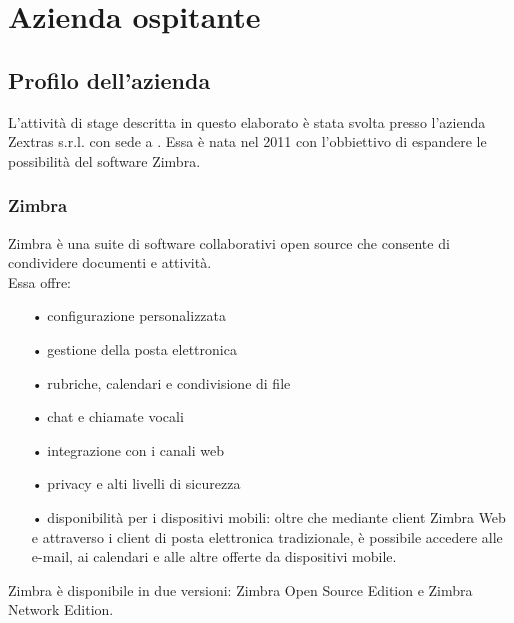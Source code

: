 \chapter{Azienda ospitante}\label{chap:company}

\section{Profilo dell'azienda}
L'attività di stage descritta in questo elaborato è stata svolta presso l'azienda Zextras s.r.l. con sede a  . Essa è nata nel 2011 con l'obbiettivo di espandere le possibilità del software Zimbra.

\subsection{Zimbra}
Zimbra è una suite di software collaborativi open source che consente di condividere documenti e attività.  \\
Essa offre:
\begin{itemize}
	\item[•] configurazione personalizzata
	\item[•] gestione della posta elettronica
	\item[•] rubriche, calendari e condivisione di file
	\item[•] chat e chiamate vocali
	\item[•] integrazione con i canali web
	\item[•] privacy e alti livelli di sicurezza
	\item[•] disponibilità per i dispositivi mobili: oltre che mediante client Zimbra Web e attraverso i client di posta elettronica tradizionale, è possibile accedere alle e-mail, ai calendari e alle altre offerte da dispositivi mobile. 
\end{itemize}
Zimbra è disponibile in due versioni: Zimbra Open Source Edition e Zimbra Network Edition. 

